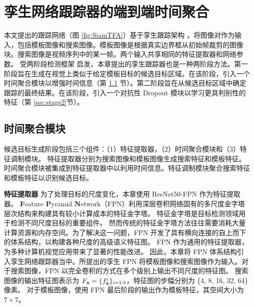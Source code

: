 \section{孪生网络跟踪器的端到端时间聚合}
本文提出的跟踪网络（图 \ref{fig:SiamTFA}）基于孪生跟踪架构 \cite{SiamRPN++, Wang2018SiamMask}，将图像对作为输入，包括模板图像和搜索图像。模板图像是根据真实边界框从初始帧裁剪的图像块。搜索图像是视频序列中的某一帧。两个输入共享相同的特征提取器和网络参数。
受两阶段检测框架 \cite{ren2015faster} 启发，本章提出的孪生跟踪器也是一种两阶段方法。第一阶段旨在生成在视觉上类似于给定模板目标的候选目标区域。在该阶段，引入一个时间聚合模块以增强时间信息（第 \ref{sec:stage1} 节）。第二阶段旨在从候选目标区域中确定跟踪的最终结果。在该阶段，引入一个对抗性 Dropout 模块以学习更具判别性的特征（第 \ref{sec:stage2}节）。

\subsection{时间聚合模块}
\label{sec:stage1}
候选目标生成阶段包括三个组件：（1）特征提取器，（2）时间聚合模块和（3）特征调制模块。
特征提取器分别为搜索图像和模板图像生成搜索特征和模板特征。时间聚合模块被集成到特征提取器中以利用时间信息。特征调制模块聚合搜索特征和模板特征以识别候选目标。

\textbf{特征提取器} 为了处理目标的尺度变化，本章使用 ResNet50-FPN \cite{lin2017feature} 作为特征提取器。
\textbf{F}eature \textbf{P}yramid \textbf{N}etwork（FPN）利用深层卷积网络固有的多尺度金字塔层次结构来构建具有较小计算成本的特征金字塔。
特征金字塔是目标检测领域用于检测不同尺度目标的重要组件。
然而传统的特征金字塔方法往往需要消耗大量计算资源和内存空间。为了解决这一问题，FPN 开发了具有横向连接的自上而下的体系结构，以构建各种尺度的高级语义特征图。
FPN 作为通用的特征提取器，为多种计算机视觉应用带来了显著的性能改进。
因此，本章将 FPN 体系结构引入孪生网络跟踪器当中。所提出的孪生 FPN 将模板图像和搜索图像作为输入。对于搜索图像，FPN 以完全卷积的方式在多个级别上输出不同尺度的特征图。
搜索图像的输出特征图表示为 $F_{\textbf x} = \{f_{\textbf x}^i\}_{i=1:5}$，特征图的步幅分别为 \{4, 8, 16, 32, 64\} 像素。
对于模板图像，使用 FPN 最后阶段的输出作为模板特征，其空间大小为 $7 \times 7$。

